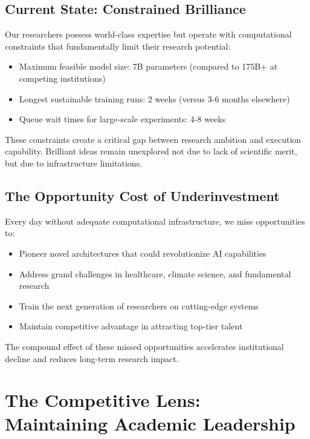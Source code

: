 \documentclass{article}
\begin{document}
\subsection{Current State: Constrained Brilliance}

Our researchers possess world-class expertise but operate with computational constraints that fundamentally limit their research potential:

\begin{itemize}
\item Maximum feasible model size: 7B parameters (compared to 175B+ at competing institutions)
\item Longest sustainable training runs: 2 weeks (versus 3-6 months elsewhere)
\item Queue wait times for large-scale experiments: 4-8 weeks
\end{itemize}

These constraints create a critical gap between research ambition and execution capability. Brilliant ideas remain unexplored not due to lack of scientific merit, but due to infrastructure limitations.

\subsection{The Opportunity Cost of Underinvestment}

Every day without adequate computational infrastructure, we miss opportunities to:

\begin{itemize}
\item Pioneer novel architectures that could revolutionize AI capabilities
\item Address grand challenges in healthcare, climate science, and fundamental research
\item Train the next generation of researchers on cutting-edge systems
\item Maintain competitive advantage in attracting top-tier talent
\end{itemize}

The compound effect of these missed opportunities accelerates institutional decline and reduces long-term research impact.


\section{The Competitive Lens: Maintaining Academic Leadership}
\end{document}
